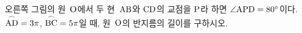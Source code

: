 \noindent\begin{minipage}[t]{0.58\linewidth}\vspace{0pt}\raggedright 오른쪽 그림의 원~$\mathrm{O}$에서 두 현~$\mathrm{AB}$와 $\mathrm{CD}$의 교점을 $\mathrm{P}$라 하면 $\angle\mathrm{APD}=80^\circ$이다. $\overset{\frown}{\mathrm{AD}}=3\pi$, $\overset{\frown}{\mathrm{BC}}=5\pi$일 때, 원~$\mathrm{O}$의 반지름의 길이를 구하시오.\end{minipage}\hfill\begin{minipage}[t]{0.4\linewidth}\vspace{0pt}\centering \resizebox{\ifdim\width>\linewidth\linewidth\else\width\fi}{!}{}\end{minipage}\par
